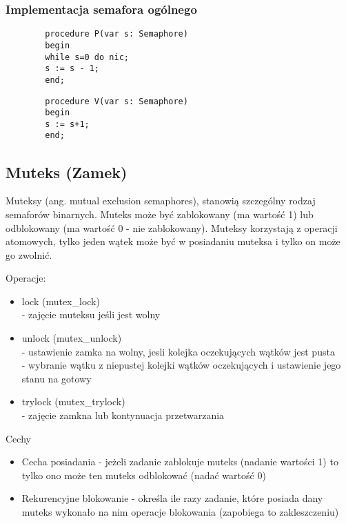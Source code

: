 \documentclass[main.tex]{subfiles}
\begin{document}
    \subsubsection{Implementacja semafora ogólnego}
    \begin{verbatim}
        procedure P(var s: Semaphore)
        begin
        while s=0 do nic;
        s := s - 1;
        end;
    \end{verbatim}

    \begin{verbatim}
        procedure V(var s: Semaphore)
        begin
        s := s+1;
        end;
    \end{verbatim}

    \subsection{Muteks (Zamek)}
    Muteksy (ang. mutual exclusion semaphores), stanowią szczególny rodzaj semaforów binarnych. Muteks może być zablokowany (ma wartość 1) lub odblokowany (ma wartość 0 - nie zablokowany). Muteksy korzystają z operacji atomowych, tylko jeden wątek może być w posiadaniu muteksa i tylko on może go zwolnić.

    Operacje:
    \begin{itemize}
        \item lock (mutex\_lock)\\ - zajęcie muteksu jeśli jest wolny
        \item unlock (mutex\_unlock) \\ - ustawienie zamka na wolny, jesli kolejka oczekujących wątków jest pusta\\
        - wybranie wątku z niepustej kolejki wątków oczekujących i ustawienie jego stanu na gotowy
        \item trylock (mutex\_trylock)\\ - zajęcie zamkna lub kontynuacja przetwarzania
    \end{itemize}

    Cechy
    \begin{itemize}
        \item Cecha posiadania - jeżeli zadanie zablokuje muteks (nadanie wartości 1) to tylko ono może ten muteks odblokować (nadać wartość 0)
        \item Rekurencyjne blokowanie - określa ile razy zadanie, które posiada dany muteks wykonało na nim operacje blokowania (zapobiega to zakleszczeniu)
    \end{itemize}
\end{document}

